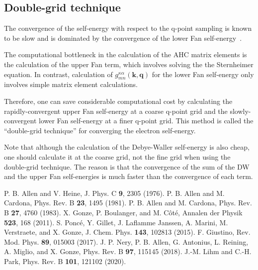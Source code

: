 \documentclass[12pt,a4paper]{article}
\newcommand{\mb}[1]{\mathbf{#1}}
\begin{document}
\subsection{Double-grid technique} \label{sec:doublegrid}
The convergence of the self-energy with respect to the q-point sampling
is known to be slow and is dominated by the convergence of the lower Fan
self-energy~\cite{2015PonceJCP}.

The computational bottleneck in the calculation of the AHC matrix elements
is the calculation of the upper Fan term, which involves solving the
the Sternheimer equation.
In contrast, calculation of $g_{mn}^{\kappa\alpha}(\mb{k},\mb{q})$ for
the lower Fan self-energy only involves simple matrix element calculations.

Therefore, one can save considerable computational cost by calculating the
rapidly-convergent upper Fan self-energy at a coarse q-point grid
and the slowly-convergent lower Fan self-energy at a finer q-point grid.
This method is called the ``double-grid technique'' for converging the electron
self-energy.

Note that although the calculation of the Debye-Waller self-energy is also
cheap, one should calculate it at the coarse grid, not the fine grid
when using the double-grid technique.
The reason is that the convergence of the sum of the DW and the upper Fan
self-energies is much faster than the convergence of each term.

\begin{thebibliography}{99}
  P. B. Allen and V. Heine, J. Phys. C {\bf 9}, 2305 (1976).
  P. B. Allen and M. Cardona, Phys. Rev. B {\bf 23}, 1495 (1981).
  P. B. Allen and M. Cardona, Phys. Rev. B {\bf 27}, 4760 (1983).
  X. Gonze, P. Boulanger, and M. C\^ot\'e, Annalen der Physik {\bf 523},
  168 (2011).
  S. Ponc\'e, Y. Gillet, J. Laflamme Janssen, A. Marini, M. Verstraete,
  and X. Gonze, J. Chem. Phys. {\bf 143}, 102813 (2015).
  F. Giustino, Rev. Mod. Phys. {\bf 89}, 015003 (2017).
  J. P. Nery, P. B. Allen, G. Antonius, L. Reining, A. Miglio, and X. Gonze,
Phys. Rev. B {\bf 97}, 115145 (2018).
  J.-M. Lihm and C.-H. Park, Phys. Rev. B {\bf 101}, 121102 (2020).
\end{thebibliography}
\end{document}
